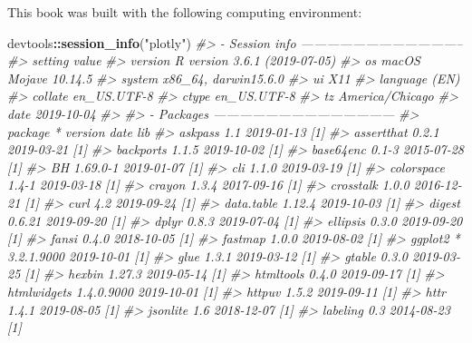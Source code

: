 \documentclass[
  12pt,
]{krantz}
\newenvironment{Shaded}{\begin{snugshade}}{\end{snugshade}}
\newcommand{\CommentTok}[1]{\textcolor[rgb]{0.56,0.35,0.01}{\textit{#1}}}
\newcommand{\KeywordTok}[1]{\textcolor[rgb]{0.13,0.29,0.53}{\textbf{#1}}}
\newcommand{\NormalTok}[1]{#1}
\newcommand{\OperatorTok}[1]{\textcolor[rgb]{0.81,0.36,0.00}{\textbf{#1}}}
\newcommand{\StringTok}[1]{\textcolor[rgb]{0.31,0.60,0.02}{#1}}
\begin{document}
This book was built with the following computing environment:

\begin{Shaded}
\begin{Highlighting}[]
\NormalTok{devtools}\OperatorTok{::}\KeywordTok{session_info}\NormalTok{(}\StringTok{"plotly"}\NormalTok{)}
\CommentTok{#> - Session info --------------------------------------}
\CommentTok{#>  setting  value                       }
\CommentTok{#>  version  R version 3.6.1 (2019-07-05)}
\CommentTok{#>  os       macOS Mojave 10.14.5        }
\CommentTok{#>  system   x86_64, darwin15.6.0        }
\CommentTok{#>  ui       X11                         }
\CommentTok{#>  language (EN)                        }
\CommentTok{#>  collate  en_US.UTF-8                 }
\CommentTok{#>  ctype    en_US.UTF-8                 }
\CommentTok{#>  tz       America/Chicago             }
\CommentTok{#>  date     2019-10-04                  }
\CommentTok{#> }
\CommentTok{#> - Packages ------------------------------------------}
\CommentTok{#>  package      * version    date       lib}
\CommentTok{#>  askpass        1.1        2019-01-13 [1]}
\CommentTok{#>  assertthat     0.2.1      2019-03-21 [1]}
\CommentTok{#>  backports      1.1.5      2019-10-02 [1]}
\CommentTok{#>  base64enc      0.1-3      2015-07-28 [1]}
\CommentTok{#>  BH             1.69.0-1   2019-01-07 [1]}
\CommentTok{#>  cli            1.1.0      2019-03-19 [1]}
\CommentTok{#>  colorspace     1.4-1      2019-03-18 [1]}
\CommentTok{#>  crayon         1.3.4      2017-09-16 [1]}
\CommentTok{#>  crosstalk      1.0.0      2016-12-21 [1]}
\CommentTok{#>  curl           4.2        2019-09-24 [1]}
\CommentTok{#>  data.table     1.12.4     2019-10-03 [1]}
\CommentTok{#>  digest         0.6.21     2019-09-20 [1]}
\CommentTok{#>  dplyr          0.8.3      2019-07-04 [1]}
\CommentTok{#>  ellipsis       0.3.0      2019-09-20 [1]}
\CommentTok{#>  fansi          0.4.0      2018-10-05 [1]}
\CommentTok{#>  fastmap        1.0.0      2019-08-02 [1]}
\CommentTok{#>  ggplot2      * 3.2.1.9000 2019-10-01 [1]}
\CommentTok{#>  glue           1.3.1      2019-03-12 [1]}
\CommentTok{#>  gtable         0.3.0      2019-03-25 [1]}
\CommentTok{#>  hexbin         1.27.3     2019-05-14 [1]}
\CommentTok{#>  htmltools      0.4.0      2019-09-17 [1]}
\CommentTok{#>  htmlwidgets    1.4.0.9000 2019-10-01 [1]}
\CommentTok{#>  httpuv         1.5.2      2019-09-11 [1]}
\CommentTok{#>  httr           1.4.1      2019-08-05 [1]}
\CommentTok{#>  jsonlite       1.6        2018-12-07 [1]}
\CommentTok{#>  labeling       0.3        2014-08-23 [1]}

\end{Highlighting}
\end{Shaded}
\end{document}
